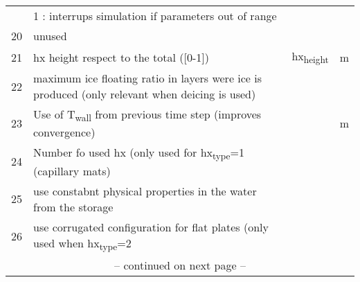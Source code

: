 \documentclass[english]{SPFReport}
\begin{document}
\begin{tabular}{| l |  m{8cm} | l | l |}
       &  1 : interrups simulation if parameters out of range && \\
20 & unused &&\\
 21 & hx height respect to the total ([0-1])& \si{hx_{height}} & m\\ 
 22 & maximum ice floating ratio in layers were ice is produced (only relevant when deicing is used) & &\\
 23 & Use of \si{T_{wall}} from previous time step (improves convergence) & &m\\
 24 & Number fo used hx (only used for \si{hx_{type}}=1 (capillary mats) &&\\
 25 & use constabnt physical properties in the water from the storage && \\
 26 & use corrugated configuration for flat plates (only used when \si{hx_{type}}=2 &&\\
 \multicolumn{4}{c}{\small -- continued on next page --} \\
\end{tabular}

\end{document}
